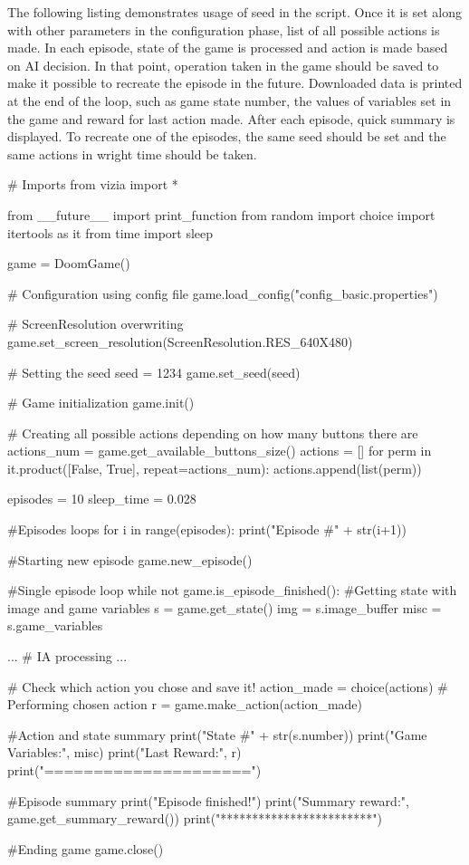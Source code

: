 \documentclass[english,bachelor,a4paper,twoside]{ppfcmthesis}
\begin{document}
The following listing demonstrates usage of seed in the script. Once it is set along with other parameters in the configuration phase, list of all possible actions is made. In each episode, state of the game is processed and action is made based on AI decision. In that point, operation taken in the game should be saved to make it possible to recreate the episode in the future. Downloaded data is printed at the end of the loop, such as game state number, the values of variables set in the game and reward for last action made. After each episode, quick summary is displayed. To recreate one of the episodes, the same seed should be set and the same actions in wright time should be taken.

\begin{pblock}
# Imports
from vizia import *

from __future__ import print_function
from random import choice
import itertools as it
from time import sleep

game = DoomGame()

# Configuration using config file
game.load_config("config_basic.properties")

# ScreenResolution overwriting  
game.set_screen_resolution(ScreenResolution.RES_640X480)

# Setting the seed
seed = 1234
game.set_seed(seed)

# Game initialization 
game.init()

# Creating all possible actions depending on how many buttons there are
actions_num = game.get_available_buttons_size()
actions = []
for perm in it.product([False, True], repeat=actions_num):
    actions.append(list(perm))

episodes = 10
sleep_time = 0.028

#Episodes loops
for i in range(episodes):
	print("Episode #" + str(i+1))

	#Starting new episode
	game.new_episode()

	#Single episode loop
	while not game.is_episode_finished():
		#Getting state with image and game variables
		s = game.get_state()
		img = s.image_buffer
		misc = s.game_variables

		...
		# IA processing
		...		
		
		# Check which action you chose and save it!
		action_made = choice(actions)
		# Performing chosen action
		r = game.make_action(action_made)
		
		#Action and state summary
		print("State #" + str(s.number))
		print("Game Variables:", misc)
		print("Last Reward:", r)
		print("=====================")
	
	#Episode summary
	print("Episode finished!")
	print("Summary reward:", game.get_summary_reward())
	print("************************")

#Ending game
game.close()
\end{pblock}
\end{document}
